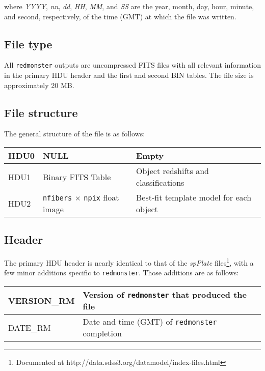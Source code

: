 \documentclass[12pt]{article}
\begin{document}
where \textit{YYYY}, \textit{nn}, \textit{dd}, \textit{HH}, \textit{MM}, and \textit{SS}
are the year, month, day, hour, minute, and second, respectively, of the time (GMT) at which
the file was written.

\subsection{File type}

All \texttt{redmonster} outputs are uncompressed FITS
files with all relevant information in the primary HDU header and the first and second
BIN tables.  The file size is approximately 20 MB.

\subsection{File structure}

The general structure of the file is as follows:

\begin{center}
	\begin{tabular}{ | l | l | l |}
	\hline
	HDU0 & NULL & Empty \\ \hline
	HDU1 & Binary FITS Table & Object redshifts and classifications \\ \hline
	HDU2 & \texttt{nfibers} $\times$ \texttt{npix} float image & Best-fit template model for each object \\
	\hline
	\end{tabular}
\end{center}

\subsection{Header}

The primary HDU header is nearly identical to that of the \textit{spPlate}
files\footnote{Documented at http://data.sdss3.org/datamodel/index-files.html}, with a few minor additions specific to \texttt{redmonster}.  Those
additions are as follows:

\begin{center}
	\begin{tabular}{ | l | l | }
	\hline
	VERSION\_RM & Version of \texttt{redmonster} that produced the file \\ \hline
	DATE\_RM & Date and time (GMT) of \texttt{redmonster} completion \\
	\hline
	\end{tabular}
\end{center}
\end{document}
